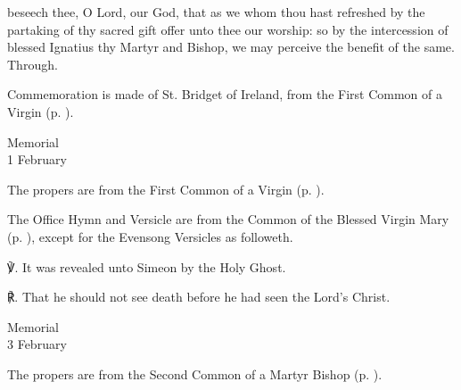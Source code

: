 
\postcommunion
{} beseech thee, O Lord, our God, that as we whom thou hast refreshed by the partaking of thy sacred gift offer unto thee our worship: so by the intercession of blessed Ignatius thy Martyr and Bishop, we may perceive the benefit of the same. Through.

\begin{rubric}
    Commemoration is made of St. Bridget of Ireland, from the First Common of a Virgin (p. \pageref{CommonVirginOnlyI}).
\end{rubric}


\begin{inhead}
    {Memorial\\
1 February}
\end{inhead}

\begin{rubric}
	The propers are from the First Common of a Virgin (p. \pageref{CommonVirginOnlyI}).
\end{rubric}




\begin{rubric}
	The Office Hymn and Versicle are from the Common of the Blessed Virgin Mary (p. \pageref{CommonBVM}), except for the Evensong Versicles as followeth.
\end{rubric}

℣. It was revealed unto Simeon by the Holy Ghost. 

℟. That he should not see death before he had seen the Lord's Christ.


\begin{inhead}
    {Memorial\\
3 February}
\end{inhead}

\begin{rubric}
	The propers are from the Second Common of a Martyr Bishop (p. \pageref{CommonMartyrBishopII}).
\end{rubric}


